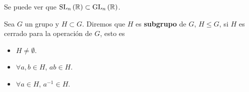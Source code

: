 \begin{observation}
Se puede ver que $\displaystyle \operatorname{SL}_{n}\left(\mathbb{R}\right) \subset \operatorname{GL}_{n}\left(\mathbb{R}\right) $. 
\end{observation}
\begin{definition}[Subgrupo]
Sea $\displaystyle G $ un grupo y $\displaystyle H \subset G $. Diremos que $\displaystyle H $ es \textbf{subgrupo} de $\displaystyle G $, $\displaystyle H \leq G $, si $\displaystyle H $ es cerrado para la operación de $\displaystyle G $, esto es
\begin{itemize}
\item $\displaystyle H \neq \emptyset $.
\item $\displaystyle \forall a,b \in H $, $\displaystyle ab \in H $.
\item $\displaystyle \forall a \in H $, $\displaystyle a^{-1} \in H $.
\end{itemize}

\end{definition}

